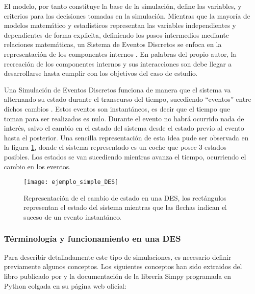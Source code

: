 \documentclass[12pt]{article}
\begin{document}
El modelo, por tanto constituye la base de la simulación, define las variables, y criterios para las decisiones tomadas en la simulación. Mientras que la mayoría de modelos matemático y estadísticos representan las variables independientes y dependientes de forma explicita, definiendo los pasos intermedios mediante relaciones matemáticas, un Sistema de Eventos Discretos se enfoca en la representación de los componentes internos \citep{banks1998handbook}. En palabras del propio autor, la recreación de los componentes internos y sus interacciones son debe llegar a desarrollarse hasta cumplir con los objetivos del caso de estudio.

Una Simulación de Eventos Discretos funciona de manera que el sistema va alternando su estado durante el transcurso del tiempo, sucediendo ``eventos'' entre dichos cambios \citep{varga2001discrete}. Estos eventos son instantáneos, es decir que el tiempo que toman para ser realizados es nulo. Durante el evento no habrá ocurrido nada de interés, salvo el cambio en el estado del sistema desde el estado previo al evento hasta el posterior. Una sencilla representación de esta idea pude ser observada en la figura \ref{fig:diagrama_basico_DES}, donde el sistema representado es un coche que posee 3 estados posibles. Los estados se van sucediendo mientras avanza el tiempo, ocurriendo el cambio en los eventos.

\begin{figure}[h]
    \begin{center}
        \texttt{[image: ejemplo\_simple\_DES]}    
    \end{center}
    \caption{Representación de el cambio de estado en una DES, los rectángulos representan el estado del sistema mientras que las flechas indican el suceso de un evento instantáneo.}
    \label{fig:diagrama_basico_DES}
\end{figure}

\subsubsection{Términología y funcionamiento en una DES}\label{TF_DES}

Para describir detalladamente este tipo de simulaciones, es necesario definir previamente algunos conceptos. Los siguientes conceptos han sido extraidos del libro publicado por \citep{banks1998handbook} y la documentación de la librería Simpy programada en Python colgada en su página web oficial:
\end{document}
